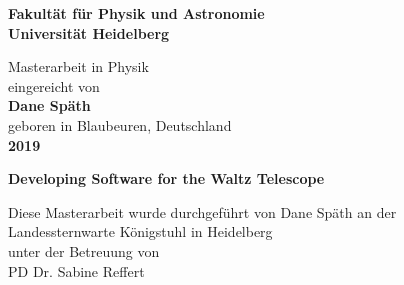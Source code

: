 \begin{titlepage}
\begin{center}
 
\Large\textbf{Fakultät für Physik und Astronomie\\
Universität Heidelberg}

\vspace{16cm}

\normalsize
Masterarbeit in Physik\\
eingereicht von\\
\vspace{0.5cm}
\Large\textbf{Dane Späth}\\
\normalsize
\vspace{0.5cm}
geboren in Blaubeuren, Deutschland \\
\vspace{0.5cm}
\Large\textbf{2019}
\normalsize


\cleardoublepage




\Large\textbf{Developing Software for the Waltz Telescope}

\vspace{18cm}

\normalsize
Diese Masterarbeit wurde durchgeführt von Dane Späth an der\\
Landessternwarte Königstuhl in Heidelberg\\
unter der Betreuung von\\
PD Dr. Sabine Reffert

\vfill
\end{center}

\end{titlepage}
